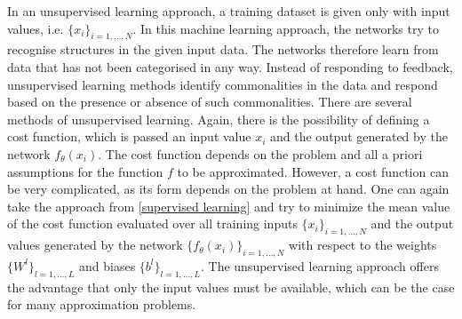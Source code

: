 In an unsupervised learning approach, a training dataset is given only with input values, i.e. $\{ x_i \}_{i = 1, \ldots, N}$. In this machine learning approach, the networks try to recognise structures in the given input data. The networks therefore learn from data that has not been categorised in any way. Instead of responding to feedback, unsupervised learning methods identify commonalities in the data and respond based on the presence or absence of such commonalities. There are several methods of unsupervised learning. Again, there is the possibility of defining a cost function, which is passed an input value $x_i$ and the output generated by the network $f_{\theta}(x_i)$. The cost function depends on the problem and all a priori assumptions for the function $f$ to be approximated. However, a cost function can be very complicated, as its form depends on the problem at hand. One can again take the approach from \cref{supervised learning} and try to minimize the mean value of the cost function evaluated over all training inputs $\{ x_i \}_{i = 1, \ldots, N}$ and the output values generated by the network $\{ f_{\theta}(x_i) \}_{i = 1, \ldots, N}$ with respect to the weights $\{ W^l \}_{l = 1, \ldots, L}$ and biases $\{ b^l \}_{l = 1, \ldots, L}$. The unsupervised learning approach offers the advantage that only the input values must be available, which can be the case for many approximation problems. \\

